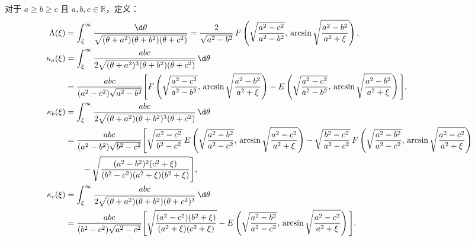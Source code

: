对于 \( a \ge b \ge c \) 且 \( a, b, c \in \mathbb{R} \)，定义：
\small
\begin{align*}
	\Lambda(\xi)
	 & = \int_{\xi}^{\infty} \frac{ \d  \theta }
	{ \sqrt{ (\theta + a^2)(\theta + b^2)(\theta + c^2) } } = \frac{2}{ \sqrt{a^2 - b^2} } \,
	F\left( \sqrt{ \frac{a^2 - c^2}{a^2 - b^2} },\,
	\arcsin \sqrt{ \frac{a^2 - b^2}{a^2 + \xi} } \right),                                                                \\
	\kappa_a(\xi)
	 & = \int_{\xi}^{\infty} \frac{abc}{2 \sqrt{ (\theta + a^2)^3 (\theta + b^2)(\theta + c^2) } } \, \d  \theta  \notag \\
	 & = \frac{abc}{(a^2 - c^2) \sqrt{a^2 - b^2}} \Bigg[
		F\left( \sqrt{ \frac{a^2 - c^2}{a^2 - b^2} },\,
		\arcsin \sqrt{ \frac{a^2 - b^2}{a^2 + \xi} } \right) - E\left( \sqrt{ \frac{a^2 - c^2}{a^2 - b^2} },\,
		\arcsin \sqrt{ \frac{a^2 - b^2}{a^2 + \xi} } \right)
	\Bigg],                                                                                                              \\
	\kappa_b(\xi)
	 & = \int_{\xi}^{\infty} \frac{abc}{2 \sqrt{ (\theta + a^2)(\theta + b^2)^3(\theta + c^2) } } \, \d  \theta  \notag  \\
	 & = \frac{abc}{(a^2 - b^2) \sqrt{b^2 - c^2}} \Bigg[
		\sqrt{ \frac{a^2 - c^2}{b^2 - c^2} } \,
		E\left( \sqrt{ \frac{a^2 - b^2}{a^2 - c^2} },\,
		\arcsin \sqrt{ \frac{a^2 - c^2}{a^2 + \xi} } \right)- \sqrt{ \frac{b^2 - c^2}{a^2 - c^2} } \,
		F\left( \sqrt{ \frac{a^2 - b^2}{a^2 - c^2} },\,
	\arcsin \sqrt{ \frac{a^2 - c^2}{a^2 + \xi} } \right) \notag                                                          \\
	 & \qquad - \sqrt{ \frac{ (a^2 - b^2)^2 (c^2 + \xi) }{ (b^2 - c^2)(a^2 + \xi)(b^2 + \xi) } }
	\Bigg],                                                                                                              \\
	\kappa_c(\xi)
	 & = \int_{\xi}^{\infty} \frac{abc}{2 \sqrt{ (\theta + a^2)(\theta + b^2)(\theta + c^2)^3 } } \, \d  \theta \notag   \\
	 & = \frac{abc}{(b^2 - c^2) \sqrt{a^2 - c^2}} \Bigg[
		\sqrt{ \frac{(a^2 - c^2)(b^2 + \xi)}{(a^2 + \xi)(c^2 + \xi)} } - E\left( \sqrt{ \frac{a^2 - b^2}{a^2 - c^2} },\,
		\arcsin \sqrt{ \frac{a^2 - c^2}{a^2 + \xi} } \right)
		\Bigg].
\end{align*}
\normalsize

